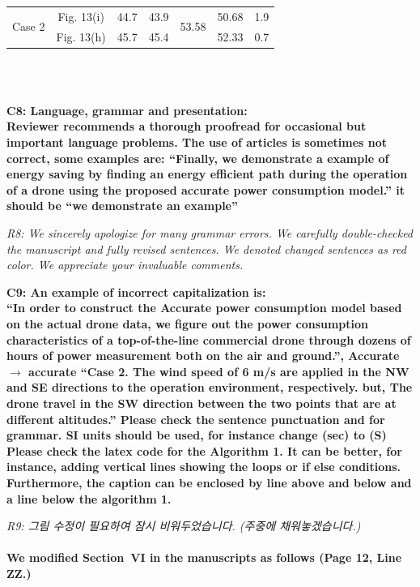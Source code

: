 \documentclass[onecolumn]{IEEEconf}
\begin{document}
\begin{description}
\begin{mdframed}[ linewidth=.75pt, userdefinedwidth=0.9\textwidth]
{\begin{tabular}{|c|c|c|c|c|c|c|}
    \multirow{2}{*}{Case 2} & Fig. 13(i) & 44.7     & 43.9         & \multirow{2}{*}{53.58} & 50.68        & 1.9  \\ \cline{2-4} \cline{6-7} 
                        & Fig. 13(h) & 45.7     & 45.4         &                        & 52.33        & 0.7  \\ \hline
    \end{tabular}%
    }
    \end{mdframed}
    ~\\
    ~\\
    \item \textbf
    {
	C8: Language, grammar and presentation: \\
	Reviewer recommends a thorough proofread for occasional but important language problems.
	The use of articles is sometimes not correct, some examples are: ``Finally, we demonstrate a example of energy saving by finding an energy efficient path during the operation of a drone using the proposed accurate power consumption model.'' it should be ``we demonstrate an example''
	}
	\item \textit
	{
	R8: We sincerely apologize for many grammar errors. We carefully double-checked the manuscript and fully revised sentences. We denoted changed sentences as red color. We appreciate your invaluable comments.
    }
    ~\\
    \item \textbf
    {
	C9: An example of incorrect capitalization is: \\
	``In order to construct the Accurate power consumption model based on the actual drone data, we figure out the power consumption characteristics of a top-of-the-line commercial drone through dozens of hours of power measurement both on the air and ground.'', Accurate $\rightarrow$ accurate
	``Case 2. The wind speed of 6 m/s are
	applied in the NW and SE directions to the operation environment, respectively. but, The drone travel in the SW direction between the two points that are at different altitudes.'' Please check the sentence punctuation and for grammar.
	SI units should be used, for instance change (sec) to (S)
	Please check the latex code for the Algorithm 1. It can be better, for instance, adding vertical lines showing the loops or if else conditions.
	Furthermore, the caption can be enclosed by line above and below and a line below the algorithm 1.
	}
	\item \textit
	{
	R9: 그림 수정이 필요하여 잠시 비워두었습니다. (주중에 채워놓겠습니다.)
    }
    ~\\
	~\\
	\textbf{We modified Section~VI in the manuscripts as follows (Page 12, Line ZZ.)}\\
    \begin{mdframed}[ linewidth=.75pt, userdefinedwidth=0.9\textwidth]


\end{mdframed}
\end{description}
\end{document}
